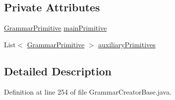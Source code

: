 \subsection*{Private Attributes}
\begin{DoxyCompactItemize}
\item 
\hyperlink{classit_1_1emarolab_1_1cagg_1_1core_1_1language_1_1syntax_1_1GrammarPrimitive}{Grammar\-Primitive} \hyperlink{classit_1_1emarolab_1_1cagg_1_1core_1_1evaluation_1_1semanticGrammar_1_1syntaxCompiler_1_1Gramma476c64fc54be5b96aaf6048986cec760_a1e49a575da03e6301db21581a30f2367}{main\-Primitive}
\item 
List$<$ \hyperlink{classit_1_1emarolab_1_1cagg_1_1core_1_1language_1_1syntax_1_1GrammarPrimitive}{Grammar\-Primitive} $>$ \hyperlink{classit_1_1emarolab_1_1cagg_1_1core_1_1evaluation_1_1semanticGrammar_1_1syntaxCompiler_1_1Gramma476c64fc54be5b96aaf6048986cec760_a84107aca0e6240655ba4f86b7ed1a60b}{auxiliary\-Primitives}
\end{DoxyCompactItemize}


\subsection{Detailed Description}


Definition at line 254 of file Grammar\-Creator\-Base.\-java.



